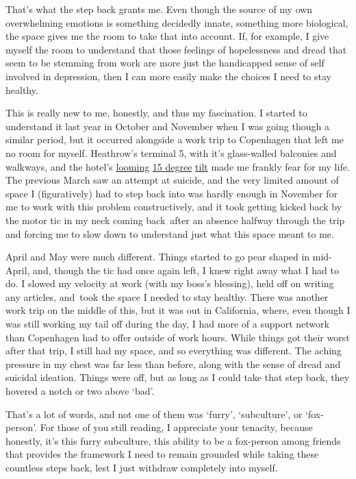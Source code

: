 That's what the step back grants me. Even though the source of my own
overwhelming emotions is something decidedly innate, something more
biological, the space gives me the room to take that into account. If,
for example, I give myself the room to understand that those feelings of
hopelessness and dread that seem to be stemming from work are more just
the handicapped sense of self involved in depression, then I can more
easily make the choices I need to stay healthy.

This is really new to me, honestly, and thus my fascination. I started
to understand it last year in October and November when I was going
though a similar period, but it occurred alongside a work trip to
Copenhagen that left me no room for myself. Heathrow's terminal 5, with
it's glass-walled balconies and walkways, and the hotel's
\href{http://www.flickr.com/photos/ranna/8128316641/}{looming}
\href{http://www.flickr.com/photos/ranna/8128342888/}{15 degree}
\href{http://www.flickr.com/photos/ranna/8164105438/}{tilt} made me
frankly fear for my life. The previous March saw an attempt at suicide,
and the very limited amount of space I (figuratively) had to step back
into was hardly enough in November for me to work with this problem
constructively, and it took getting kicked back by the motor tic in my
neck coming back~after an absence halfway through the trip and forcing
me to slow down to understand just what this space meant to me.

April and May were much different. Things started to go pear shaped in
mid-April, and, though the tic had once again left, I knew right away
what I had to do. I slowed my velocity at work (with my boss's
blessing), held off on writing any articles, and~took the space I needed
to stay healthy. There was another work trip on the middle of this, but
it was out in California, where, even though I was still working my tail
off during the day, I had more of a support network than Copenhagen had
to offer outside of work hours. While things got their worst after that
trip, I still had my space, and so everything was different. The aching
pressure in my chest was far less than before, along with the sense of
dread and suicidal ideation. Things were off, but as long as I could
take that step back, they hovered a notch or two above `bad'.

That's a lot of words, and not one of them was `furry', `subculture', or
`fox-person'. For those of you still reading, I appreciate your
tenacity, because honestly, it's this furry subculture, this ability to
be a fox-person among friends that provides the framework I need to
remain grounded while taking these countless steps back, lest I just
withdraw completely into myself.

